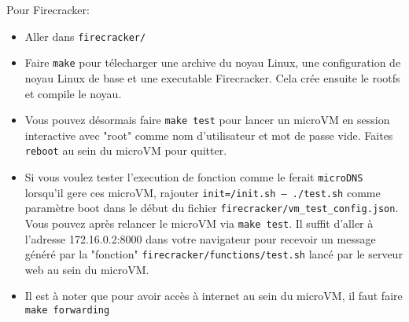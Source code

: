 \documentclass[12pt]{article}
\begin{document}
Pour Firecracker:
\begin{itemize}
	\item Aller dans \texttt{firecracker/}
	\item Faire \lstinline|make| pour télecharger une archive du noyau Linux, une configuration de noyau Linux de base et une executable Firecracker. Cela crée ensuite le rootfs et compile le noyau. 
	\item Vous pouvez désormais faire  \lstinline|make test| pour lancer un microVM en session interactive avec "root" comme nom d'utilisateur et mot de passe vide. Faites \lstinline|reboot| au sein du microVM pour quitter.
	\item Si vous voulez tester l'execution de fonction comme le ferait \texttt{microDNS} lorsqu'il gere ces microVM, rajouter \texttt{init=/init.sh -- ./test.sh} comme paramètre boot dans le début du fichier \texttt{firecracker/vm\_test\_config.json}. Vous pouvez après relancer le microVM via \lstinline|make test|. Il suffit d'aller à l'adresse 172.16.0.2:8000 dans votre navigateur pour recevoir un message généré par la "fonction" \texttt{firecracker/functions/test.sh} lancé par le serveur web au sein du microVM.
	\item Il est à noter que pour avoir accès à internet au sein du microVM, il faut faire \lstinline|make forwarding|
\end{itemize}

\pagebreak
\nocite{*}


\end{document}

